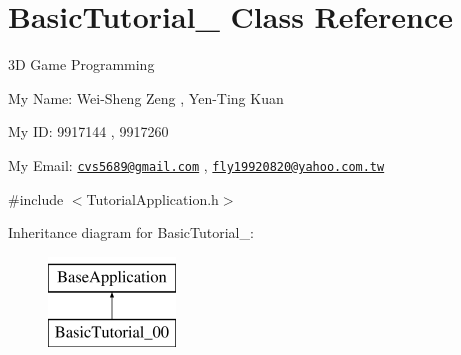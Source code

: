 \hypertarget{class_basic_tutorial__00}{\section{Basic\-Tutorial\-\_ Class Reference}
\label{class_basic_tutorial__00}
}


3\-D Game Programming \par
 My Name\-: Wei-\/\-Sheng Zeng , Yen-\/\-Ting Kuan \par
 My I\-D\-: 9917144 , 9917260 \par
 My Email\-: \href{mailto:cvs5689@gmail.com}{\tt cvs5689@gmail.\-com} , \href{mailto:fly19920820@yahoo.com.tw}{\tt fly19920820@yahoo.\-com.\-tw}  




{\ttfamily \#include $<$Tutorial\-Application.\-h$>$}

Inheritance diagram for Basic\-Tutorial\-\_\-:\begin{figure}[H]
\begin{center}
\leavevmode
\includegraphics[height=2.382979cm]{class_basic_tutorial__00}
\end{center}
\end{figure}
